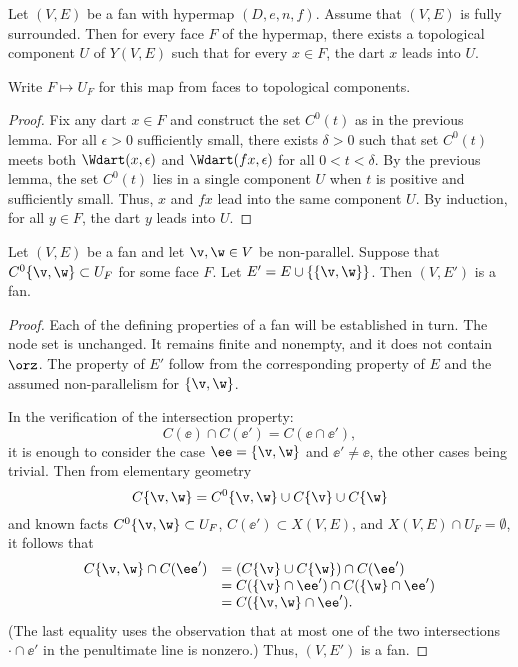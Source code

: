 \begin{lemma}[] \label{lemma:UF}
Let $(V,E)$ be a fan with hypermap $(D,e,n,f)$.  Assume that $(V,E)$
is fully surrounded.  Then for every face $F$ of the hypermap, there
exists a topological component $U$ of $Y(V,E)$ such that for every
$x\in F$, the dart $x$ leads into $U$.
\end{lemma}
%
%
%

Write $F\mapsto U_F$ for this map from faces to topological components.
%

\begin{proof} Fix any dart $x\in F$ and construct the set $C^0(t)$ as
in the previous lemma.  For all $\epsilon>0$ sufficiently small,
there exists $\delta>0$ such that set $C^0(t)$ meets both
$\Wdart(x,\epsilon)$ and $\Wdart(f x,\epsilon)$ for all
$0<t<\delta$.  By the previous lemma, the set $C^0(t)$ lies in a
single component $U$ when $t$ is positive and sufficiently small.
Thus, $x$ and $f x$ lead into the same component $U$.  By induction,
for all $y\in F$, the dart $y$ leads into $U$.
\end{proof}

\begin{lemma}[]\label{lemma:add-edge}
Let $(V,E)$ be a fan and let $\v,\w\in V$ be non-parallel.  Suppose
that $C^0\{\v,\w\}\subset U_F$ for some face $F$.  Let $E' =
E\cup\{\{\v,\w\}\}$.  Then $(V,E')$ is a fan.
\end{lemma}

\begin{proof} Each of the defining properties of a fan will be
established in turn.  The node set is unchanged.  It remains finite
and nonempty, and it does not contain $\orz$.  The property
 of $E'$ follow from the corresponding property
of $E$ and the assumed non-parallelism for $\{\v,\w\}$.

In the verification of the intersection property:
\begin{displaymath}
C(\ee)\cap C(\ee') = C(\ee \cap \ee'),
\end{displaymath}
it is enough to consider the case $\ee = \{\v,\w\}$ and $\ee' \ne
\ee$, the other cases being trivial.  Then from elementary geometry 
\begin{displaymath}
C\{\v,\w\} = C^0\{\v,\w\}\cup C\{\v\}\cup C\{\w\}
\end{displaymath}
and
known facts
$C^0\{\v,\w\}\subset U_F$, $C(\ee')\subset X(V,E)$, and $X(V,E)\cap
U_F=\emptyset$, it follows that
\begin{displaymath}
\begin{array}{rll}
C\{\v,\w\} \cap C(\ee')  &= (C\{\v\} \cup C\{\w\}) \cap C(\ee') \\
&= C(\{\v\}\cap \ee') \cap C(\{\w\}\cap \ee')\\
&= C(\{\v,\w\}\cap \ee').
\end{array}
\end{displaymath}
(The last equality uses the observation that at most one of the two
intersections $\cdot\cap\ee'$ in the penultimate line is nonzero.)
Thus, $(V,E')$ is a fan.
\end{proof}


